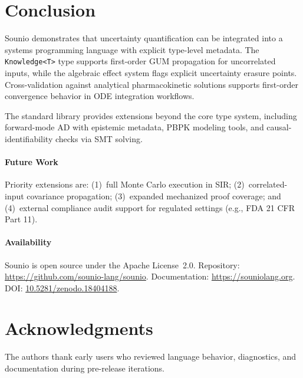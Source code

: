 \documentclass[journal]{IEEEtran}
\begin{document}
\section{Conclusion}
\label{sec:conclusion}

Sounio demonstrates that uncertainty quantification can be integrated
into a systems programming language with explicit type-level metadata.
The \texttt{Knowledge<T>} type supports first-order GUM propagation for
uncorrelated inputs, while the algebraic effect system flags explicit
uncertainty erasure points. Cross-validation against analytical
pharmacokinetic solutions supports first-order convergence behavior in ODE
integration workflows.

The standard library provides extensions beyond the core type system,
including forward-mode AD with epistemic metadata, PBPK modeling tools,
and causal-identifiability checks via SMT solving.

\paragraph{Future Work}
Priority extensions are: (1)~full Monte Carlo execution in SIR;
(2)~correlated-input covariance propagation; (3)~expanded mechanized
proof coverage; and (4)~external compliance audit support for regulated
settings (e.g., FDA 21 CFR Part 11).

\paragraph{Availability}
Sounio is open source under the Apache License~2.0.
Repository: \url{https://github.com/sounio-lang/sounio}.
Documentation: \url{https://souniolang.org}.
DOI: \href{https://doi.org/10.5281/zenodo.18404188}{10.5281/zenodo.18404188}.

\section*{Acknowledgments}
The authors thank early users who reviewed language behavior,
diagnostics, and documentation during pre-release iterations.



\end{document}
